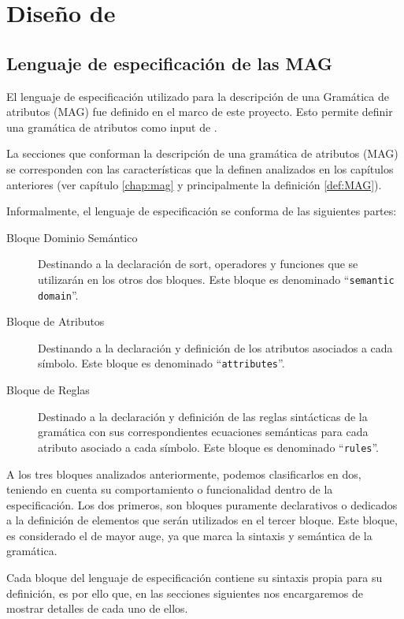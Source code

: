 \chapter{Diseño de \maggen}
\label{chap:disen_}
\minitoc

\section{Lenguaje de especificación de las MAG}
\label{sec:lenguajeMAG}

El lenguaje de especificación utilizado para la descripción de una Gramática de atributos (MAG) fue definido en el marco de este proyecto. Esto permite definir una gramática de atributos como input de \maggen.
 
La secciones que conforman la descripción de una gramática de atributos (MAG) se corresponden con las características que la definen analizados en los capítulos anteriores (ver capítulo \ref{chap:mag} y principalmente la definición \ref{def:MAG}).
 
Informalmente, el lenguaje de especificación se conforma de las siguientes partes:

\begin{description}
\item [Bloque Dominio Semántico] Destinando a la declaración de sort, operadores y funciones que se utilizarán en los otros dos bloques. Este bloque es denominado ``\texttt{semantic domain}''.

\item [Bloque de Atributos] Destinando a la declaración y definición de los atributos asociados a cada símbolo. Este bloque es denominado ``\texttt{attributes}''.

\item [Bloque de Reglas] Destinado a la declaración y definición de las reglas sintácticas de la gramática con sus correspondientes ecuaciones semánticas para cada atributo asociado a cada símbolo. Este bloque es denominado ``\texttt{rules}''.
\end{description}

A los tres bloques analizados anteriormente, podemos clasificarlos en dos, teniendo en cuenta su comportamiento o funcionalidad dentro de la especificación. Los dos primeros, son bloques puramente declarativos o dedicados a la definición de elementos que serán utilizados en el tercer bloque. Este bloque, es considerado el de mayor auge, ya que marca la sintaxis y semántica de la gramática.

Cada bloque del lenguaje de especificación contiene su sintaxis propia para su definición, es por ello que, en las secciones siguientes nos encargaremos de mostrar detalles de cada uno de ellos.

